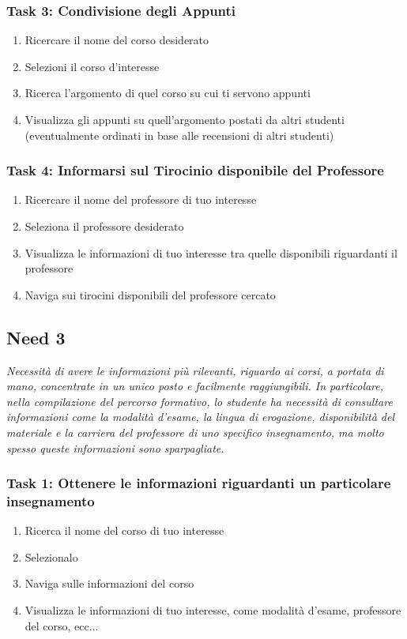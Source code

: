 \subsubsection{Task 3: Condivisione degli Appunti}
\begin{enumerate}
    \item Ricercare il nome del corso desiderato
    \item Selezioni il corso d’interesse
    \item Ricerca l’argomento di quel corso su cui ti servono appunti
    \item Visualizza gli appunti su quell’argomento postati da altri studenti (eventualmente ordinati in base alle recensioni di altri studenti)  
\end{enumerate}

\subsubsection{Task 4: Informarsi sul Tirocinio disponibile del Professore}
\begin{enumerate}
    \item Ricercare il nome del professore di tuo interesse
    \item Seleziona il professore desiderato
    \item Visualizza le informazioni di tuo interesse tra quelle disponibili riguardanti il professore
    \item Naviga sui tirocini disponibili del professore cercato
\end{enumerate} 

\subsection{Need 3}
\begin{center}
    \textit{Necessità di avere le informazioni più rilevanti, riguardo ai corsi, a portata di mano, concentrate in un unico posto e facilmente raggiungibili.
    In particolare, nella compilazione del percorso formativo, lo studente ha necessità di consultare informazioni come la modalità d’esame, la lingua di erogazione, disponibilità del materiale e la carriera del professore di uno specifico insegnamento, ma molto spesso queste informazioni sono sparpagliate.}
\end{center}
\subsubsection{Task 1: Ottenere le informazioni riguardanti un particolare insegnamento}
\begin{enumerate}
    \item Ricerca il nome del corso di tuo interesse
    \item Selezionalo
    \item Naviga sulle informazioni del corso
    \item Visualizza le informazioni di tuo interesse, come modalità d’esame, professore del corso, ecc...
\end{enumerate}


